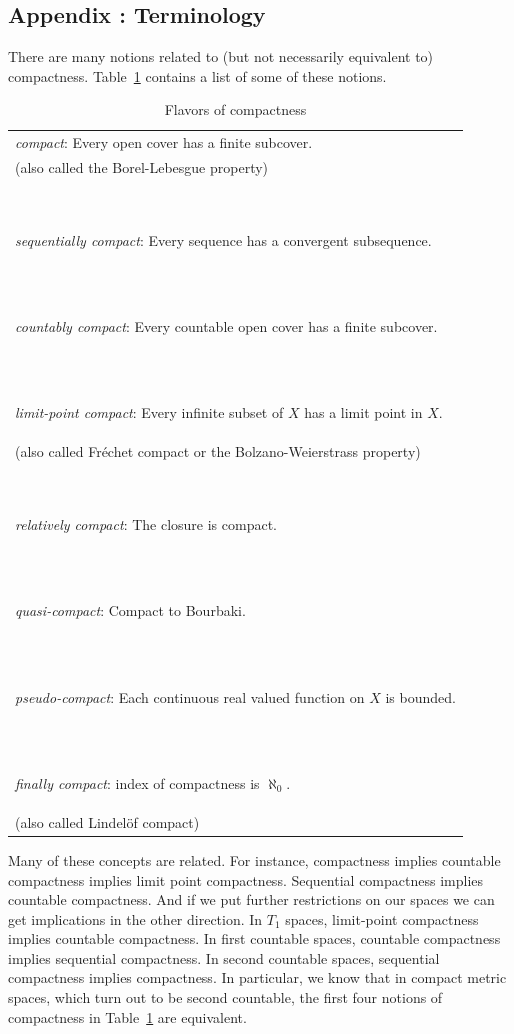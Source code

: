 \documentclass[12pt]{article}
\begin{document}
\pagebreak
\pagebreak
\subsection{Appendix :  Terminology}
There are many notions related to (but not necessarily equivalent to) compactness. Table~\ref{t:flavors} contains a list of some of these notions.\\


\begin{table}[h]
\centering

\begin{tabular}{|p{4.3 in}|}

\hline
[open-cover] \emph{compact}:  Every open cover has a finite subcover.\\
(also called the Borel-Lebesgue property)\\\

\emph{sequentially compact}:  Every sequence has a convergent subsequence.\\\

\emph{countably compact}:  Every countable open cover has a finite subcover.\\\

\emph{limit-point compact}:  Every infinite subset of $X$  has a limit point in $X$.\\
(also called Fr\'{e}chet compact or the Bolzano-Weierstrass property)\\\

\emph{relatively compact}:  The closure is compact.\\\

\emph{quasi-compact}:  Compact to Bourbaki.\\\

\emph{pseudo-compact}:  Each continuous real valued function on $X$  is bounded.\\\

\emph{finally compact}:  index of compactness is ${\aleph_0}$.\\
(also called Lindel\"{o}f compact)\\

\hline

\end{tabular}

\caption{Flavors of compactness}
\label{t:flavors}


\end{table}

Many of these concepts are related. For instance, compactness
implies countable compactness implies limit point compactness. Sequential compactness
implies countable compactness.  And if we put further restrictions on our spaces we
can get implications in the other direction. In $T_1$ spaces, limit-point compactness
implies countable compactness. In first countable spaces, countable compactness
implies sequential compactness. In second countable spaces, sequential compactness
implies compactness. In particular, we know that in compact metric spaces, which turn out to
be second countable, the first four notions of compactness in Table~\ref{t:flavors}
are equivalent.
\end{document}
